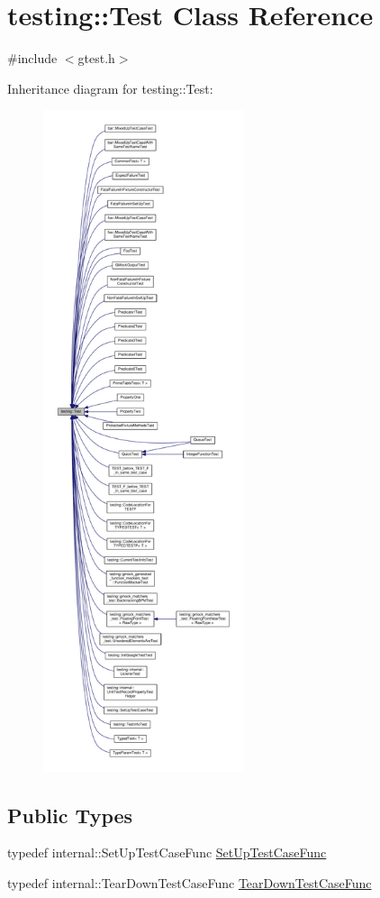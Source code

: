 \hypertarget{classtesting_1_1Test}{}\section{testing\+:\+:Test Class Reference}
\label{classtesting_1_1Test}


{\ttfamily \#include $<$gtest.\+h$>$}



Inheritance diagram for testing\+:\+:Test\+:
\nopagebreak
\begin{figure}[H]
\begin{center}
\leavevmode
\includegraphics[height=550pt]{classtesting_1_1Test__inherit__graph}
\end{center}
\end{figure}
\subsection*{Public Types}
\begin{DoxyCompactItemize}
\item 
typedef internal\+::\+Set\+Up\+Test\+Case\+Func \hyperlink{classtesting_1_1Test_a5f2a051d1d99c9b784c666c586186cf9}{Set\+Up\+Test\+Case\+Func}
\item 
typedef internal\+::\+Tear\+Down\+Test\+Case\+Func \hyperlink{classtesting_1_1Test_aa0f532e93b9f3500144c53f31466976c}{Tear\+Down\+Test\+Case\+Func}
\end{DoxyCompactItemize}

